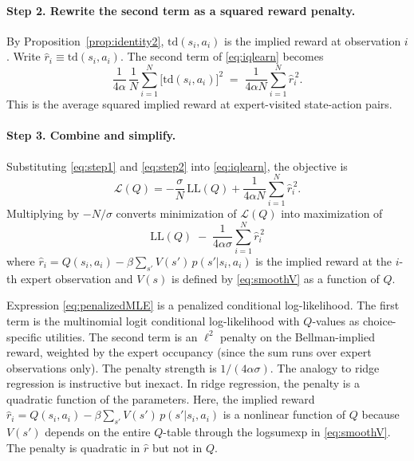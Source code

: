 \documentclass[11pt]{article}
\begin{document}
\paragraph{Step 2. Rewrite the second term as a squared reward penalty.}

By Proposition~\ref{prop:identity2}, $\mathrm{td}(s_i,a_i)$ is the implied reward at observation $i$. Write $\hat{r}_i \equiv \mathrm{td}(s_i, a_i)$. The second term of \eqref{eq:iqlearn} becomes
\begin{equation}
\frac{1}{4\alpha}\,\frac{1}{N}\sum_{i=1}^{N}\bigl[\mathrm{td}(s_i,a_i)\bigr]^2 \;=\; \frac{1}{4\alpha N}\sum_{i=1}^{N} \hat{r}_i^{\,2}.
\label{eq:step2}
\end{equation}
This is the average squared implied reward at expert-visited state-action pairs.

\paragraph{Step 3. Combine and simplify.}

Substituting \eqref{eq:step1} and \eqref{eq:step2} into \eqref{eq:iqlearn}, the objective is
\[
\mathcal{L}(Q) = -\frac{\sigma}{N}\,\mathrm{LL}(Q) + \frac{1}{4\alpha N}\sum_{i=1}^{N} \hat{r}_i^{\,2}.
\]
Multiplying by $-N/\sigma$ converts minimization of $\mathcal{L}(Q)$ into maximization of
\begin{equation}
\boxed{\;\mathrm{LL}(Q) \;-\; \frac{1}{4\alpha\sigma}\sum_{i=1}^{N} \hat{r}_i^{\,2}\;}
\label{eq:penalizedMLE}
\end{equation}
where $\hat{r}_i = Q(s_i,a_i) - \beta \sum_{s'} V(s')\,p(s'|s_i,a_i)$ is the implied reward at the $i$-th expert observation and $V(s)$ is defined by \eqref{eq:smoothV} as a function of $Q$.

\medskip

Expression \eqref{eq:penalizedMLE} is a penalized conditional log-likelihood. The first term is the multinomial logit conditional log-likelihood with $Q$-values as choice-specific utilities. The second term is an $\ell^2$ penalty on the Bellman-implied reward, weighted by the expert occupancy (since the sum runs over expert observations only). The penalty strength is $1/(4\alpha\sigma)$. The analogy to ridge regression is instructive but inexact. In ridge regression, the penalty is a quadratic function of the parameters. Here, the implied reward $\hat{r}_i = Q(s_i,a_i) - \beta\sum_{s'} V(s')\,p(s'|s_i,a_i)$ is a nonlinear function of $Q$ because $V(s')$ depends on the entire $Q$-table through the logsumexp in \eqref{eq:smoothV}. The penalty is quadratic in $\hat{r}$ but not in $Q$.
\end{document}
